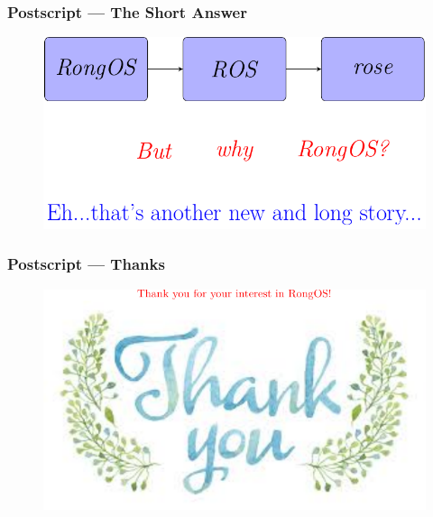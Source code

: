 \documentclass{beamer}
\begin{document}
\begin{frame}
  \frametitle{Postscript — The Short Answer}
  \begin{figure}
    \includegraphics[scale=.9]{answer.pdf}
  \end{figure}
  
\end{frame}


\begin{frame}
  \frametitle{Postscript — Thanks}
  \begin{figure}
    \includegraphics[scale=.8]{thanks.pdf}
  \end{figure}
  
\end{frame}


 
\end{document}

